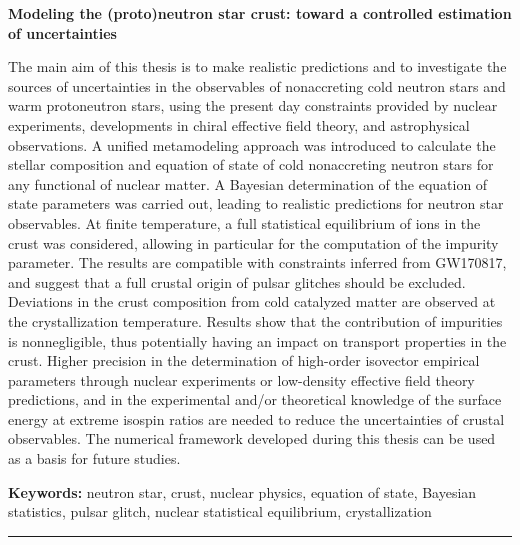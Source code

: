\clearpage
\thispagestyle{empty} %
\newpage
\enlargethispage{2\baselineskip}

\vspace*{-6\baselineskip}
\begin{changemargin}{-0.2cm}{-1.2cm} 
\noindent
\begin{center}
\textbf{Modeling the (proto)neutron star crust: toward a controlled estimation
of uncertainties}
\end{center}

The main aim of this thesis is to make realistic predictions and to
investigate the sources of uncertainties in the observables of nonaccreting
cold neutron stars and warm protoneutron stars, using the present day 
constraints provided by nuclear experiments, developments in chiral 
effective field theory, and astrophysical observations.
A unified metamodeling approach was introduced to calculate the stellar 
composition and equation of state of cold nonaccreting neutron stars for any 
functional of nuclear matter.
A Bayesian determination of the equation of state parameters was carried out,
leading to realistic predictions for neutron star observables.
At finite temperature, a full statistical equilibrium of ions in the crust was 
considered, allowing in particular for the computation of the impurity 
parameter.
The results are compatible with constraints inferred from GW170817, and
suggest that a full crustal origin of pulsar glitches should be excluded. 
Deviations in the crust composition from cold catalyzed matter are 
observed at the crystallization temperature. 
Results show that the contribution of impurities is nonnegligible, 
thus potentially having an impact on transport properties in the crust.
Higher precision in the determination of high-order isovector
empirical parameters through nuclear experiments or low-density effective field 
theory predictions, and in the experimental and/or theoretical knowledge of the 
surface energy at extreme isospin ratios are needed to reduce the uncertainties 
of crustal observables. 
The numerical framework developed during this thesis can be used as a basis for 
future studies.

\noindent
\textbf{Keywords:} 
neutron star, crust, nuclear physics, equation of state, Bayesian statistics, 
pulsar glitch, nuclear statistical equilibrium, crystallization 

\begin{center}
  \noindent\rule[0.5ex]{0.8\linewidth}{1pt}
\end{center}


\end{changemargin}
